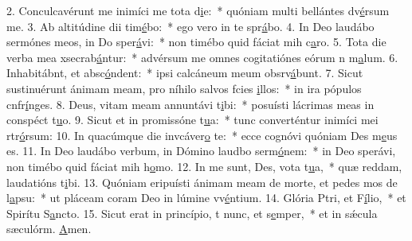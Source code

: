 2. Conculcavérunt me inimíci me tota d\uline{i}e:~* quóniam multi bellántes dv\uline{é}rsum me.
3. Ab altitúdine dii tim\uline{é}bo:~* ego vero in te spr\uline{á}bo.
4. In Deo laudábo sermónes meos, in Do sper\uline{á}vi:~* non timébo quid fáciat mih c\uline{a}ro.
5. Tota die verba mea xsecrab\uline{á}ntur:~* advérsum me omnes cogitatiónes eórum n m\uline{a}lum.
6. Inhabitábnt, et absc\uline{ó}ndent:~* ipsi calcáneum meum obsrv\uline{á}bunt.
7. Sicut sustinuérunt ánimam meam, pro níhilo salvos fcies \uline{i}llos:~* in ira pópulos cnfr\uline{í}nges.
8. Deus, vitam meam annuntávi t\uline{i}bi:~* posuísti lácrimas meas in conspéct t\uline{u}o.
9. Sicut et in promissóne t\uline{u}a:~* tunc converténtur inimíci mei rtr\uline{ó}rsum:
10. In quacúmque die invcáver\uline{o} te:~* ecce cognóvi quóniam Des m\uline{e}us es.
11. In Deo laudábo verbum, in Dómino laudbo serm\uline{ó}nem:~* in Deo sperávi, non timébo quid fáciat mih h\uline{o}mo.
12. In me sunt, Des, vota t\uline{u}a,~* quæ reddam, laudatións t\uline{i}bi.
13. Quóniam eripuísti ánimam meam de morte, et pedes mos de l\uline{a}psu:~* ut pláceam coram Deo in lúmine vv\uline{é}ntium.
14. Glória Ptri, et F\uline{í}lio,~* et Spirítu S\uline{a}ncto.
15. Sicut erat in princípio, t nunc, et s\uline{e}mper,~* et in sǽcula sæculórm. \uline{A}men.
